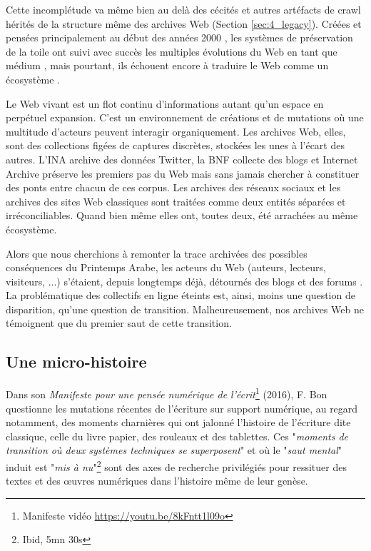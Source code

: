 \documentclass[symmetric,justified,marginals=raggedouter]{tufte-book}
\begin{document}
Cette incomplétude va même bien au delà des cécités et autres artéfacts de crawl hérités de la structure même des archives Web (Section \ref{sec:4_legacy}). Créées et pensées principalement au début des années 2000 \citep{masanes_web_2006}, les systèmes de préservation de la toile ont suivi avec succès les multiples évolutions du Web en tant que médium \citep{cho_evolution_1999,oita_archiving_2010,pop_archiving_2010}, mais pourtant, ils échouent encore à traduire le Web comme un écosystème \citep{brugger_website_2009}. 

Le Web vivant est un flot continu d'informations autant qu'un espace en perpétuel expansion. C'est un environnement de créations et de mutations où une multitude d'acteurs peuvent interagir organiquement. Les archives Web, elles, sont des collections figées de captures discrètes, stockées les unes à l'écart des autres. L'INA archive des données Twitter, la BNF collecte des blogs et Internet Archive préserve les premiers pas du Web mais sans jamais chercher à constituer des ponts entre chacun de ces corpus. Les archives des réseaux sociaux et les archives des sites Web classiques sont traitées comme deux entités séparées et irréconciliables. Quand bien même elles ont, toutes deux, été arrachées au même écosystème. 

Alors que nous cherchions à remonter la trace archivées des possibles conséquences du Printemps Arabe, les acteurs du Web (auteurs, lecteurs, visiteurs, ...) s'étaient, depuis longtemps déjà, détournés des blogs et des forums \citep{khondker_role_2011,lotan_arab_2011}. La problématique des collectifs en ligne éteints est, ainsi, moins une question de disparition, qu'une question de transition. Malheureusement, nos archives Web ne témoignent que du premier saut de cette transition.  

\subsection{Une micro-histoire}

\noindent Dans son \textit{Manifeste pour une pensée numérique de l'écrit}\footnote{Manifeste vidéo \url{https://youtu.be/8kFntt1l09o}} (2016), F. Bon questionne les mutations récentes de l'écriture sur support numérique, au regard notamment, des moments charnières qui ont jalonné l'histoire de l'écriture dite classique, celle du livre papier, des rouleaux et des tablettes. Ces "\textit{moments de transition où deux systèmes techniques se superposent}" et où le "\textit{saut mental}" induit est "\textit{mis à nu}"\footnote{Ibid, 5mn 30s} sont des axes de recherche privilégiés pour ressituer des textes et des œuvres numé\-riques dans l'histoire même de leur genèse. 
\end{document}
